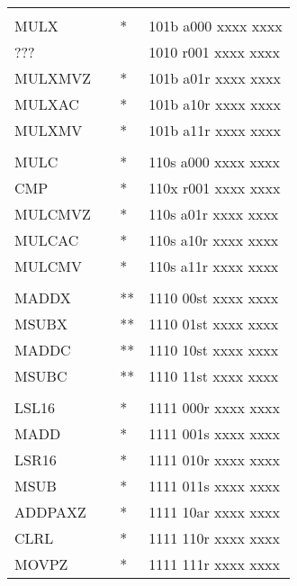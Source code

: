 \documentclass[oneside,english,a4paper,10pt,oneside,openany,final]{memoir}
\begin{document}
\begin{center}
\begin{longtable}{TllT}
            &          &    &                                         \\
MULX        &          & *  & 101b a000 xxxx xxxx                     \\
???         &          &    & 1010 r001 xxxx xxxx                     \\
MULXMVZ     &          & *  & 101b a01r xxxx xxxx                     \\
MULXAC      &          & *  & 101b a10r xxxx xxxx                     \\
MULXMV      &          & *  & 101b a11r xxxx xxxx                     \\
            &          &    &                                         \\
MULC        &          & *  & 110s a000 xxxx xxxx                     \\
CMP         &          & *  & 110x r001 xxxx xxxx                     \\
MULCMVZ     &          & *  & 110s a01r xxxx xxxx                     \\
MULCAC      &          & *  & 110s a10r xxxx xxxx                     \\
MULCMV      &          & *  & 110s a11r xxxx xxxx                     \\
            &          &    &                                         \\
MADDX       &          & ** & 1110 00st xxxx xxxx                     \\
MSUBX       &          & ** & 1110 01st xxxx xxxx                     \\
MADDC       &          & ** & 1110 10st xxxx xxxx                     \\
MSUBC       &          & ** & 1110 11st xxxx xxxx                     \\
            &          &    &                                         \\
LSL16       &          & *  & 1111 000r xxxx xxxx                     \\
MADD        &          & *  & 1111 001s xxxx xxxx                     \\
LSR16       &          & *  & 1111 010r xxxx xxxx                     \\
MSUB        &          & *  & 1111 011s xxxx xxxx                     \\
ADDPAXZ     &          & *  & 1111 10ar xxxx xxxx                     \\
CLRL        &          & *  & 1111 110r xxxx xxxx                     \\
MOVPZ       &          & *  & 1111 111r xxxx xxxx
\end{longtable}
\end{center}
\end{document}
